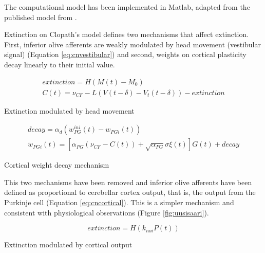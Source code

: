 \documentclass[12pt, a4paper,twoside]{tesi_upf}
\begin{document}
The computational model has been implemented in Matlab, adapted from the published model from \cite{Clopath2014}.

Extinction on Clopath's model defines two mechanisms that affect extinction. First, inferior olive afferents are weakly modulated by head movement (vestibular signal) (Equation \ref {eq:cnvestibular}) and second, weights on cortical plasticity decay linearly to their initial value.

\begin{mycapequ}[!ht]
  \begin{equation}
    \begin{split}
      extinction = H(M(t) - M_0) \\
      C(t) = \nu_{CF} - L(V(t- \delta) - V_t(t-\delta)) - extinction
    \end{split}
  \end{equation}
  \caption[Extinction modulated by head movement]{Extinction modulated by head movement}
  \label{eq:cnvestibular}
\end{mycapequ}

\begin{mycapequ}[!ht]
  \begin{equation}
    \begin{split}
      decay = \alpha_{d}(w_{PG}^{ini}(t) - w_{PGi}(t)) \\
      \dot w_{PGi}(t) = [\alpha_{PG}(\nu_{CF} - C(t)) + \sqrt{\alpha_{PG}}\sigma\xi(t)]G(t) + decay
    \end{split}
  \end{equation}
  \caption[Cortical weight decay mechanism]{Cortical weight decay mechanism}
  \label{eq:weightdecay}
\end{mycapequ}

This two mechanisms have been removed and inferior olive afferents have been defined as proportional to cerebellar cortex output, that is, the output from the Purkinje cell (Equation \ref {eq:cncortical}). This is a simpler mechanism and consistent with physiological observations (Figure \ref {fig:uusisaari}).

\begin{mycapequ}[!ht]
  \begin{equation}
    extinction = H(k_{noi}P(t))
  \end{equation}
  \caption[Extinction modulated by cortical output]{Extinction modulated by cortical output}
  \label{eq:cncortical}
\end{mycapequ}
\end{document}
